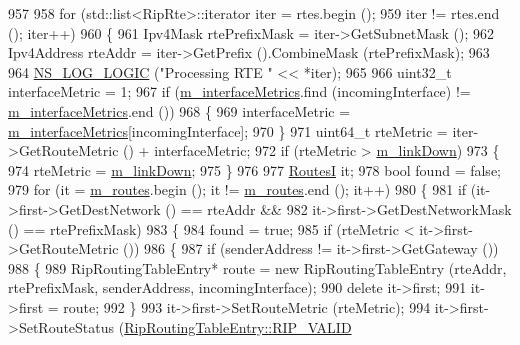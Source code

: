 \begin{DoxyCode}
957 
958   \textcolor{keywordflow}{for} (std::list<RipRte>::iterator iter = rtes.begin ();
959       iter != rtes.end (); iter++)
960     \{
961       Ipv4Mask rtePrefixMask = iter->GetSubnetMask ();
962       Ipv4Address rteAddr = iter->GetPrefix ().CombineMask (rtePrefixMask);
963 
964       \hyperlink{group__logging_ga88acd260151caf2db9c0fc84997f45ce}{NS\_LOG\_LOGIC} (\textcolor{stringliteral}{"Processing RTE "} << *iter);
965 
966       uint32\_t interfaceMetric = 1;
967       \textcolor{keywordflow}{if} (\hyperlink{classns3_1_1Rip_a297aac5454b10e21644490335f72364a}{m\_interfaceMetrics}.find (incomingInterface) != 
      \hyperlink{classns3_1_1Rip_a297aac5454b10e21644490335f72364a}{m\_interfaceMetrics}.end ())
968         \{
969           interfaceMetric = \hyperlink{classns3_1_1Rip_a297aac5454b10e21644490335f72364a}{m\_interfaceMetrics}[incomingInterface];
970         \}
971       uint64\_t rteMetric = iter->GetRouteMetric () + interfaceMetric;
972       \textcolor{keywordflow}{if} (rteMetric > \hyperlink{classns3_1_1Rip_a3f37d4c5176e380482edf0be82d2fc18}{m\_linkDown})
973         \{
974           rteMetric = \hyperlink{classns3_1_1Rip_a3f37d4c5176e380482edf0be82d2fc18}{m\_linkDown};
975         \}
976 
977       \hyperlink{classns3_1_1Rip_a8819af4dd44f270b6b19be755b39bce8}{RoutesI} it;
978       \textcolor{keywordtype}{bool} found = \textcolor{keyword}{false};
979       \textcolor{keywordflow}{for} (it = \hyperlink{classns3_1_1Rip_aea6c918ae311cd88fb2bfb714d6f9c30}{m\_routes}.begin (); it != \hyperlink{classns3_1_1Rip_aea6c918ae311cd88fb2bfb714d6f9c30}{m\_routes}.end (); it++)
980         \{
981           \textcolor{keywordflow}{if} (it->first->GetDestNetwork () == rteAddr &&
982               it->first->GetDestNetworkMask () == rtePrefixMask)
983             \{
984               found = \textcolor{keyword}{true};
985               \textcolor{keywordflow}{if} (rteMetric < it->first->GetRouteMetric ())
986                 \{
987                   \textcolor{keywordflow}{if} (senderAddress != it->first->GetGateway ())
988                     \{
989                       RipRoutingTableEntry* route = \textcolor{keyword}{new} RipRoutingTableEntry (rteAddr, rtePrefixMask, 
      senderAddress, incomingInterface);
990                       \textcolor{keyword}{delete} it->first;
991                       it->first = route;
992                     \}
993                   it->first->SetRouteMetric (rteMetric);
994                   it->first->SetRouteStatus (\hyperlink{classns3_1_1RipRoutingTableEntry_a4326145be5c3027f2ddf9eb80b6127a4ac29e62da26c18bf4b9caa5224cfee895}{RipRoutingTableEntry::RIP\_VALID}

\end{DoxyCode}
